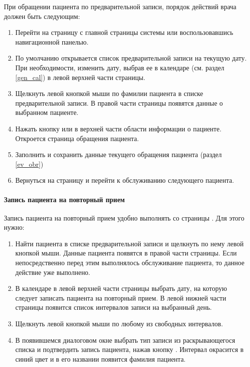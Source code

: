 {При обращении пациента по предварительной записи, порядок действий врача должен быть следующим:
\begin{enumerate}
	\item Перейти на страницу  с главной страницы системы или воспользовавшись навигационной панелью.
	\item По умолчанию открывается список предварительной записи на текущую дату. При необходимости, изменить дату, выбрав ее в календаре (см. раздел \ref{gen_cal}) в левой верхней части страницы.
	\item Щелкнуть левой кнопкой мыши по фамилии пациента в списке предварительной записи. В правой части страницы появятся данные о выбранном пациенте.
	\item Нажать кнопку  или  в верхней части области информации о пациенте. Откроется страница обращения пациента.
	\item Заполнить и сохранить данные текущего обращения пациента (раздел \ref{ev_obr})
	\item Вернуться на страницу  и перейти к обслуживанию следующего пациента.
\end{enumerate}

\paragraph{Запись пациента на повторный прием} 

Запись пациента на повторный прием удобно выполнять со страницы . Для этого нужно:
\begin{enumerate}
	\item Найти пациента в списке предварительной записи и щелкнуть по нему левой кнопкой мыши. Данные пациента появятся в правой части страницы. Если непосредственно перед этим выполнялось обслуживание пациента, то данное действие уже выполнено.
	\item В календаре в левой верхней части страницы выбрать дату, на которую следует записать пациента на повторный прием. В левой нижней части страницы появится список интервалов записи на выбранный день.
	\item Щелкнуть левой кнопкой мыши по любому из свободных интервалов.
	\item В появившемся диалоговом окне выбрать тип записи из раскрывающегося списка и подтвердить запись пациента, нажав кнопку . Интервал окрасится в синий цвет и в его названии появится фамилия пациента.
\end{enumerate} 

}
